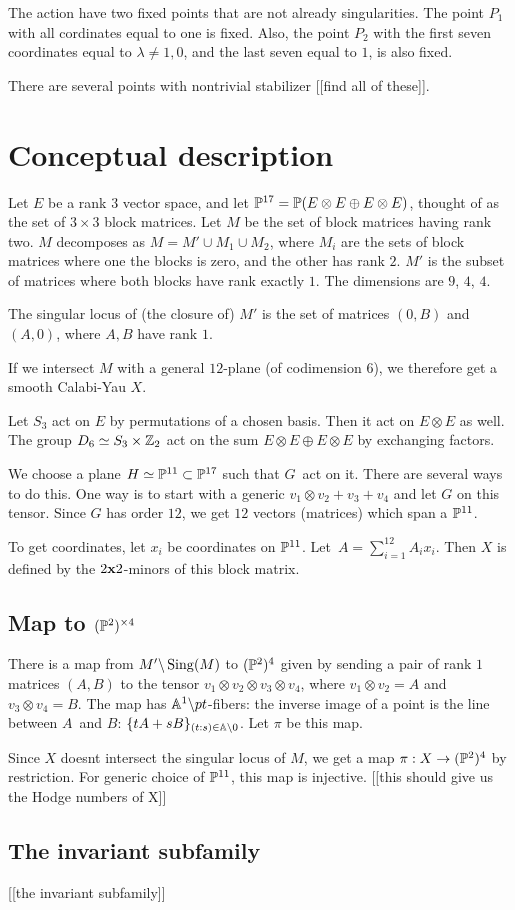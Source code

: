\documentclass[11pt, english]{article}
\begin{document}
The action have two fixed points that are not already singularities. The point $P_1$ with all cordinates equal to one is fixed. Also, the point $P_2$ with the first seven coordinates equal to $\lambda \neq 1,0$, and the last seven equal to $1$, is also fixed.

There are several points with nontrivial stabilizer [[find all of these]].

\section{Conceptual description}

Let $E$ be a rank $3$ vector space, and let $\mathbb{P}^{17}=\mathbb{P}(E \otimes E \oplus E \otimes E)$, thought of as the set of $3\times 3$ block matrices. Let $M$ be the set of block matrices having rank two. $M$ decomposes as $M=M' \cup M_1 \cup M_2$, where $M_i$ are the sets of block matrices where one the blocks is zero, and the other has rank $2$. $M'$ is the subset of matrices where both blocks have rank exactly $1$. The dimensions are $9$, $4$, $4$.

The singular locus of (the closure of) $M'$ is the set of matrices $(0,B)$ and $(A,0)$, where $A,B$ have rank $1$.

If we intersect $M$ with a general $12$-plane (of codimension $6$), we therefore get a smooth Calabi-Yau $X$.

Let $S_3$ act on $E$ by permutations of a chosen basis. Then it act on $E \otimes E$ as well. The group $D_6 \simeq S_3 \times \mathbb{Z}_2$ act on the sum $E \otimes E \oplus E \otimes E$ by exchanging factors.

We choose a plane $H \simeq \mathbb{P}^{11} \subset \mathbb{P}^{17}$ such that $G$ act on it. There are several ways to do this. One way is to start with a generic $v_1 \otimes v_2 + v_3+v_4$ and let $G$ on this tensor. Since $G$ has order $12$, we get $12$ vectors (matrices) which span a $\mathbb{P}^{11}$.

To get coordinates, let $x_i$ be coordinates on $\mathbb{P}^{11}$. Let $A = \sum_{i=1}^{12} A_i x_i$. Then $X$ is defined by the $2\mathbf{x} 2$-minors of this block matrix.

\subsection{Map to $(\mathbb{P}^2)^{\times 4}$}

There is a map from $M' \backslash \operatorname{Sing} (M)$ to $(\mathbb{P}^2)^4$ given by sending a pair of rank $1$ matrices $(A,B)$ to the tensor $v_1 \otimes v_2 \otimes v_3 \otimes v_4$, where $v_1 \otimes v_2 = A$ and $v_3 \otimes v_4=B$. The map has $\mathbb{A}^1 \backslash pt$-fibers: the inverse image of a point is the line between $A$ and $B$: $\{ tA + s B\}_{(t:s) \in \mathbb{A} \backslash 0}$. Let $\pi$ be this map.

Since $X$ doesnt intersect the singular locus of $M$, we get a map $\pi:X \to (\mathbb{P}^2)^4$ by restriction. For generic choice of $\mathbb{P}^{11}$, this map is injective. [[this should give us the Hodge numbers of X]]

\subsection{The invariant subfamily}

[[the invariant subfamily]]
\end{document}
